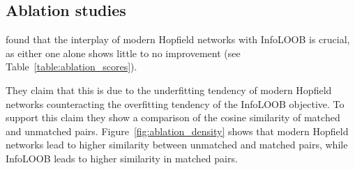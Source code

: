 \documentclass{scrarticle}
\begin{document}
\subsection{Ablation studies}

\citet{cloob} found that the interplay of modern Hopfield networks with InfoLOOB is crucial, as either one alone shows little to no improvement (see Table~\ref{table:ablation_scores}).

\begin{table}[H]
  \begin{center}
  \end{center}
  \caption{Influence of loss functions and Hopfield retrieval for models pre-trained on CC for 31 epochs (left) and 128 epochs (right, indicated by *). Adapted from \citet{cloob}.}
  \label{table:ablation_scores}
\end{table}

They claim that this is due to the underfitting tendency of modern Hopfield networks counteracting the overfitting tendency of the InfoLOOB objective. To support this claim they show a comparison of the cosine similarity of matched and unmatched pairs. Figure~\ref{fig:ablation_density} shows that modern Hopfield networks lead to higher similarity between unmatched and matched pairs, while InfoLOOB leads to higher similarity in matched pairs.
\end{document}
